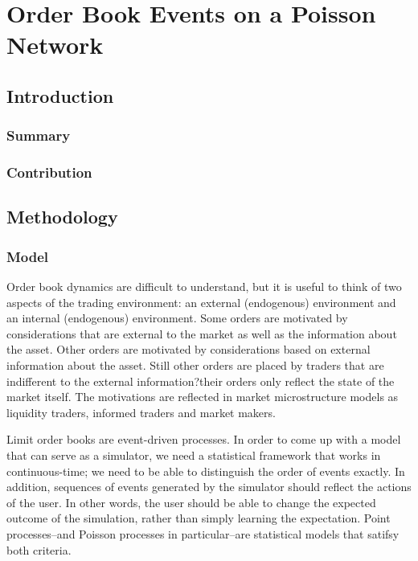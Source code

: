 \chapter{Order Book Events on a Poisson Network}
\label{chapter:four}

\section{Introduction}

\subsection{Summary}

\subsection{Contribution}

\section{Methodology}

\subsection{Model}
Order book dynamics are difficult to understand, but it is useful to think of two aspects of the trading environment: an external (endogenous) environment and an internal (endogenous) environment. Some orders are motivated by considerations that are external to the market as well as the information about the asset. Other orders are motivated by considerations based on external information about the asset. Still other orders are placed by traders that are indifferent to the external information?their orders only reflect the state of the market itself. The motivations are reflected in market microstructure models as liquidity traders, informed traders and market makers.

Limit order books are event-driven processes. In order to come up with a model that can serve as a simulator, we need a statistical framework that works in continuous-time; we need to be able to distinguish the order of events exactly. In addition, sequences of events generated by the simulator should reflect the actions of the user. In other words, the user should be able to change the expected outcome of the simulation, rather than simply learning the expectation. Point processes--and Poisson processes in particular--are statistical models that satifsy both criteria.

